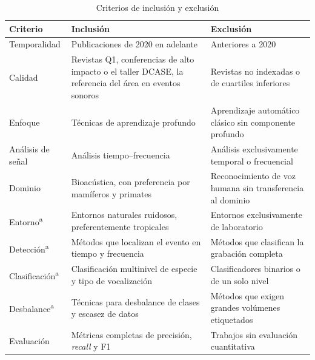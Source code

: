 \begin{table}[htbp]
    \centering
    \begin{threeparttable}
    \caption{Criterios de inclusión y exclusión}
    \label{tab:criterios}
    \small
    \begin{tabular}{@{}L{2.8cm}L{5.6cm}L{5.6cm}@{}}
        \toprule
        \textbf{Criterio} & \textbf{Inclusión}                                         & \textbf{Exclusión}                                        \\
        \midrule
        Temporalidad      & Publicaciones de 2020 en adelante                          & Anteriores a 2020                                         \\
        \addlinespace
        Calidad           & Revistas Q1, conferencias de alto impacto o el taller DCASE, la referencia del área en eventos sonoros & Revistas no indexadas o de cuartiles inferiores           \\
        \addlinespace
        Enfoque           & Técnicas de aprendizaje profundo                           & Aprendizaje automático clásico sin componente profundo    \\
        \addlinespace
        Análisis de señal & Análisis tiempo--frecuencia                                & Análisis exclusivamente temporal o frecuencial            \\
        \addlinespace
        Dominio           & Bioacústica, con preferencia por mamíferos y primates      & Reconocimiento de voz humana sin transferencia al dominio \\
        \addlinespace
        Entorno\textsuperscript{a} & Entornos naturales ruidosos, preferentemente tropicales    & Entornos exclusivamente de laboratorio                    \\
        \addlinespace
        Detección\textsuperscript{a} & Métodos que localizan el evento en tiempo y frecuencia     & Métodos que clasifican la grabación completa              \\
        \addlinespace
        Clasificación\textsuperscript{a} & Clasificación multinivel de especie y tipo de vocalización & Clasificadores binarios o de un solo nivel                \\
        \addlinespace
        Desbalance\textsuperscript{a} & Técnicas para desbalance de clases y escasez de datos      & Métodos que exigen grandes volúmenes etiquetados          \\
        \addlinespace
        Evaluación        & Métricas completas de precisión, \textit{recall} y F1      & Trabajos sin evaluación cuantitativa                      \\

\end{tabular}
\end{threeparttable}
\end{table}
